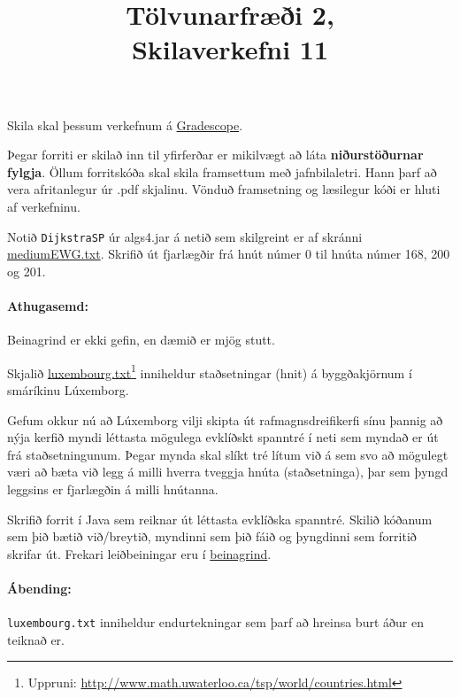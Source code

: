 \documentclass{article}
\title{Tölvunarfræði 2, \semester \\ Skilaverkefni 11}
\author{}
\begin{document}
\maketitle
{}

Skila skal þessum verkefnum á \href{https://gradescope.com/courses/14122}{Gradescope}.

Þegar forriti er skilað inn til yfirferðar er mikilvægt að láta \textbf{niðurstöðurnar fylgja}. Öllum forritskóða skal skila framsettum með jafnbilaletri. Hann þarf að vera afritanlegur úr .pdf skjalinu. Vönduð framsetning og læsilegur kóði er hluti af verkefninu.

\question
Notið \texttt{DijkstraSP} úr algs4.jar á netið sem skilgreint er af skránni \href{https://algs4.cs.princeton.edu/43mst/mediumEWG.txt}{mediumEWG.txt}. Skrifið út fjarlægðir frá hnút númer 0 til hnúta númer 168, 200 og 201.

\paragraph{Athugasemd:} Beinagrind er ekki gefin, en dæmið er mjög stutt.

\question
Skjalið \href{https://raw.githubusercontent.com/Ernir/kennsluefni/master/T2/Code/w12/luxembourg.txt}{luxembourg.txt}\footnote{Uppruni: \url{http://www.math.uwaterloo.ca/tsp/world/countries.html}} inniheldur staðsetningar (hnit) á byggðakjörnum í smáríkinu Lúxemborg.

Gefum okkur nú að Lúxemborg vilji skipta út rafmagnsdreifikerfi sínu þannig að nýja kerfið myndi léttasta mögulega evklíðskt spanntré  í neti sem myndað er út frá staðsetningunum. Þegar mynda skal slíkt tré lítum við á sem svo að mögulegt væri að bæta við legg á milli hverra tveggja hnúta (staðsetninga), þar sem þyngd leggsins er fjarlægðin á milli hnútanna.

Skrifið forrit í Java sem reiknar út léttasta evklíðska spanntré. Skilið kóðanum sem þið bætið við/breytið, myndinni sem þið fáið og þyngdinni sem forritið skrifar út. Frekari leiðbeiningar eru í \href{https://raw.githubusercontent.com/Ernir/kennsluefni/master/T2/Code/w12/EuclideanMST.java}{beinagrind}.

\paragraph{Ábending:} \texttt{luxembourg.txt} inniheldur endurtekningar sem þarf að hreinsa burt áður en teiknað er.
\end{document}
